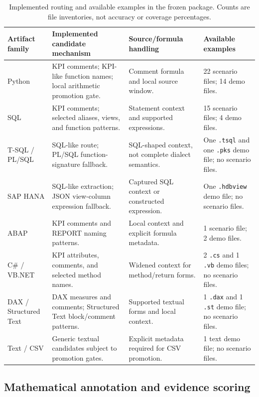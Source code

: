 \documentclass[a4paper,fleqn]{cas-dc}
\begin{document}
\begin{table}[!t]
\centering
\caption{Implemented routing and available examples in the frozen package. Counts are file inventories, not accuracy or coverage percentages.}
\label{tab:languages}
\begin{tabularx}{\textwidth}{p{}Xp{}p{}}
\toprule
\textbf{Artifact family} & \textbf{Implemented candidate mechanism} & \textbf{Source/formula handling} & \textbf{Available examples} \\
\midrule
Python & KPI comments; KPI-like function names; local arithmetic promotion gate. & Comment formula and local source window. & 22 scenario files; 14 demo files. \\
SQL & KPI comments; selected aliases, views, and function patterns. & Statement context and supported expressions. & 15 scenario files; 4 demo files. \\
T-SQL / PL/SQL & SQL-like route; PL/SQL function-signature fallback. & SQL-shaped context, not complete dialect semantics. & One \texttt{.tsql} and one \texttt{.pks} demo file; no scenario files. \\
SAP HANA & SQL-like extraction; JSON view-column expression fallback. & Captured SQL context or constructed expression. & One \texttt{.hdbview} demo file; no scenario files. \\
ABAP & KPI comments and REPORT naming patterns. & Local context and explicit formula metadata. & 1 scenario file; 2 demo files. \\
C\# / VB.NET & KPI attributes, comments, and selected method names. & Widened context for method/return forms. & 2 \texttt{.cs} and 1 \texttt{.vb} demo files; no scenario files. \\
DAX / Structured Text & DAX measures and comments; Structured Text block/comment patterns. & Supported textual forms and local context. & 1 \texttt{.dax} and 1 \texttt{.st} demo file; no scenario files. \\
Text / CSV & Generic textual candidates subject to promotion gates. & Explicit metadata required for CSV promotion. & 1 text demo file; no scenario files. \\
\bottomrule
\end{tabularx}
\end{table}

\subsection{Mathematical annotation and evidence scoring}
\label{sec:mate}
\end{document}
